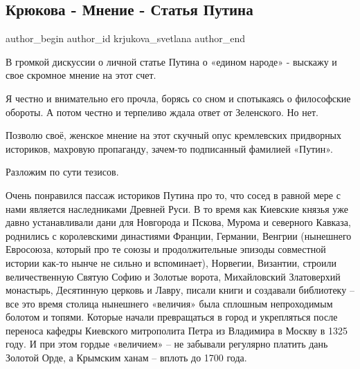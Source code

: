  
 
 
 
 
 
\subsection{Крюкова - Мнение - Статья Путина}
\label{sec:14_07_2021.fb.krjukova_svetlana.1.statja_putina_mnenie}
\ifcmt
 author_begin
   author_id krjukova_svetlana
 author_end
\fi
 
В громкой дискуссии о личной статье Путина о «едином народе» - выскажу и свое
скромное мнение на этот счет.

Я честно и внимательно его прочла, борясь со сном и спотыкаясь о философские
обороты. А потом честно и терпеливо ждала ответ от Зеленского. Но нет. 

Позволю своё, женское мнение на этот скучный опус кремлевских придворных
историков, махровую пропаганду, зачем-то подписанный фамилией «Путин».

Разложим по сути тезисов. 

Очень понравился пассаж историков Путина про то, что сосед в равной мере с нами
является наследниками Древней Руси. В то время как Киевские князья уже давно
устанавливали дани для Новгорода и Пскова, Мурома и северного Кавказа,
роднились с королевскими династиями Франции, Германии, Венгрии (нынешнего
Евросоюза, который про те союзы и продолжительные эпизоды совместной истории
как-то нынче не сильно и вспоминает), Норвегии, Византии, строили
величественную Святую Софию и Золотые ворота, Михайловский Златоверхий
монастырь, Десятинную церковь и Лавру, писали книги и создавали библиотеку –
все это время столица нынешнего «величия» была сплошным непроходимым болотом и
топями. Которые начали превращаться в город и укрепляться после переноса
кафедры Киевского митрополита Петра из Владимира в Москву в 1325 году. И при
этом гордые «величием» – не забывали регулярно платить дань Золотой Орде, а
Крымским ханам – вплоть до 1700 года.

